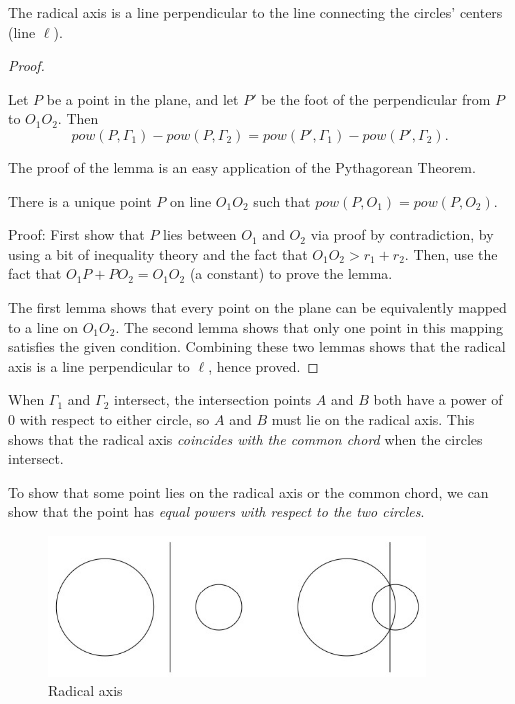 The radical axis is a line perpendicular to the line connecting the circles' centers (line $\ell$).
\begin{proof}
\begin{lemma}
Let $P$ be a point in the plane, and let $P'$ be the foot of the perpendicular from $P$ to $O_1O_2$. Then \[ pow(P, \Gamma_1) - pow(P, \Gamma_2) = pow(P', \Gamma_1) - pow(P', \Gamma_2). \]
\end{lemma}
The proof of the lemma is an easy application of the Pythagorean Theorem.

\begin{lemma}
There is a unique point $P$ on line $O_1O_2$ such that $pow(P, O_1) = pow(P, O_2)$.
\end{lemma}

Proof: First show that $P$ lies between $O_1$ and $O_2$ via proof by contradiction, by using a bit of inequality theory and the fact that $O_1O_2 > r_1 + r_2$. Then, use the fact that $O_1P + PO_2 = O_1O_2$ (a constant) to prove the lemma.

The first lemma shows that every point on the plane can be equivalently mapped to a line on $O_1O_2$. The second lemma shows that only one point in this mapping satisfies the given condition. Combining these two lemmas shows that the radical axis is a line perpendicular to $\ell$, hence proved.
\end{proof}

When $\Gamma_1$ and $\Gamma_2$ intersect, the intersection points $A$ and $B$ both have a power of $0$ with respect to either circle, so $A$ and $B$ must lie on the radical axis. This shows that the radical axis \emph{coincides with the common chord} when the circles intersect.

To show that some point lies on the radical axis or the common chord, we can show that the point has \emph{equal powers with respect to the two circles}.

\begin{figure}[H]
    \centering
    \includegraphics[width=10cm]{images/Radical_axis.jpg}
    \caption{Radical axis}
\end{figure}

